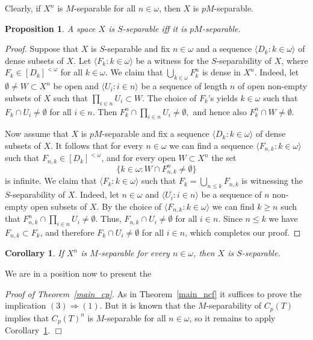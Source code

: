 \documentclass[12pt,a4paper]{amsart}
\newtheorem{proposition}[theorem]{Proposition}
\newtheorem{corollary}[theorem]{Corollary}
\theoremstyle{definition}
\newcommand{\w}{\omega}
\newcommand{\la}{\langle}
\newcommand{\ra}{\rangle}
\begin{document}
Clearly, if $X^n$ is $M$-separable for all $n\in\w$, then $X$ is $pM$-separable.

\begin{proposition} \label{pM_vs_S}
A space $X$ is $S$-separable iff it is $pM$-separable. 
\end{proposition}
\begin{proof}
Suppose that $X$ is $S$-separable and fix $n\in\w$ and a sequence
$\la D_k:k\in\w\ra$ of dense subsets of $X$. Let $\la F_k:k\in\w\ra$
be a witness for the $S$-separability of $X$, where $F_k\in [D_k]^{<\w}$ for all $k\in\w$. We claim that $\bigcup_{k\in\w} F_k^n$ is dense in $X^n$.
Indeed, let $\emptyset\neq W\subset X^n$ be open and $\la U_i:i\in n\ra$  be a sequence of length $n$ of open non-empty subsets of $X$ such that $\prod_{i\in n}U_i\subset W$.
The choice of $F_k$'s yields $k\in\w$ such that $F_k\cap U_i\neq\emptyset$
for all $i\in n$. Then $F_k^n\cap\prod_{i\in n}U_i\neq\emptyset, $
and hence also $F_k^n\cap W\neq\emptyset$.

Now assume that $X$ is $pM$-separable and fix a sequence
$\la D_k:k\in\w\ra$ of dense subsets of $X$. It follows that for every 
$n\in\w$ we can find a sequence $\la F_{n,k}:k\in\w\ra$ such that $F_{n,k}\in [D_k]^{<\w}$, and for every open  $W\subset X^n$ the set 
$$\{k\in\w:W\cap F_{n,k}^n\neq\emptyset\}$$
is infinite. We claim that $\la F_k:k\in\w\ra$ such that $F_k=\bigcup_{n\leq k}F_{n,k}$ is witnessing the $S$-separability of $X$. Indeed, let $n\in\w$ and $\la U_i:i\in n\ra$ be a sequence of $n$ non-empty open subsets of $X$.
By the choice of   $\la F_{n,k}:k\in\w\ra$ we can find 
$k\geq n$ such that $F_{n,k}^n\cap\prod_{i
\in n}U_i\neq\emptyset$. Thus, $F_{n,k}\cap U_i\neq\emptyset $ for all $i\in n$.
Since $n\leq k$ we have $F_{n,k}\subset F_k$, and therefore $F_{k}\cap U_i\neq\emptyset $ for all $i\in n$, which completes our proof. 
\end{proof}



\begin{corollary}\label{cor_sfinomom_ufinomon}
If $X^n$ is $M$-separable for every $n\in\w$, then $X$
is $S$-separable.
\end{corollary}

We are in a position now to present the 
\medskip 

\noindent\textit{Proof of Theorem~\ref{main_cp}.}
As in Theorem~\ref{main_ncf} it suffices to prove the implication $(3)\Rightarrow (1)$. But it is known \cite[Corollary 2.12]{BelBonMatTka08} that the $M$-separability of $C_p(T)$
implies that $C_p(T)^n$ is $M$-separable for all $n\in\w$, so it remains to 
apply Corollary~\ref{cor_sfinomom_ufinomon}.
\hfill $\Box$
\medskip 
\end{document}
